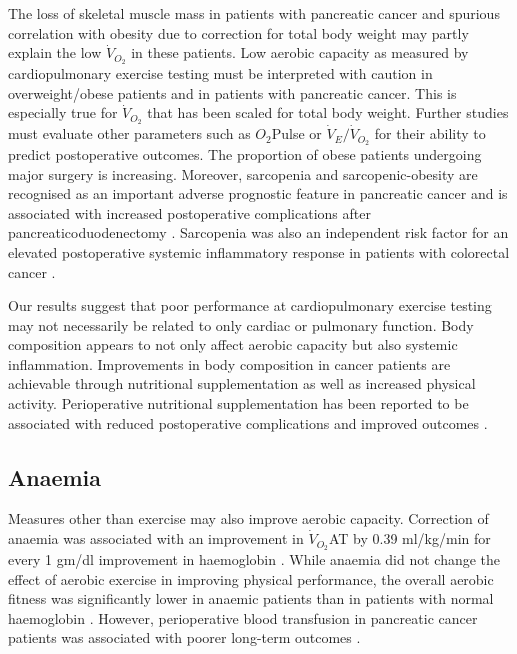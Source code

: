 The loss of skeletal muscle mass in patients with pancreatic cancer and spurious correlation with obesity due to correction for total body weight may partly explain the low $\dot{V}_{O_2}$ in these patients. 
Low aerobic capacity as measured by cardiopulmonary exercise testing must be interpreted with caution in overweight/obese patients and in patients with pancreatic cancer. 
This is especially true for $\dot{V}_{O_2}$ that has been scaled for total body weight.
Further studies must evaluate other parameters such as $O_2$Pulse or $\dot{V}_E/\dot{V}_{O_2}$ for their ability to predict postoperative outcomes. 
The proportion of obese patients undergoing major surgery is increasing. 
Moreover, sarcopenia and sarcopenic-obesity are recognised as an important adverse prognostic feature in pancreatic cancer \parencite{tan_sarcopenia_2009, peng_impact_2012} and is associated with increased postoperative complications after pancreaticoduodenectomy \parencite{joglekar_sarcopenia_2015, pausch_cachexia_2012}.
Sarcopenia was also an independent risk factor for an elevated postoperative systemic inflammatory response in patients with colorectal cancer \parencite{reisinger_sarcopenia_2015}.

Our results suggest that poor performance at cardiopulmonary exercise testing may not necessarily be related to only cardiac or pulmonary function. 
Body composition appears to not only affect aerobic capacity but also systemic inflammation.
Improvements in body composition in cancer patients are achievable through nutritional supplementation \parencite{machado_whey_2015} as well as increased physical activity.
Perioperative nutritional supplementation has been reported to be associated with reduced postoperative complications and improved outcomes \parencite{kabata_preoperative_2015, zhang_perioperative_2012}.


\subsection{Anaemia}

Measures other than exercise may also improve aerobic capacity. 
Correction of anaemia was associated with an improvement in $\dot{V}_{O_2}$AT by 0.39 ml/kg/min for every 1 gm/dl improvement in haemoglobin \parencite{wright_cardiopulmonary_2014}. 
While anaemia did not change the effect of aerobic exercise in improving physical performance, the overall aerobic fitness was significantly lower in anaemic patients than in patients with normal haemoglobin \parencite{bellotto_anemia_2011}.
However, perioperative blood transfusion in pancreatic cancer patients was associated with poorer long-term outcomes \parencite{kneuertz_effects_2011, sutton_perioperative_2014}.

